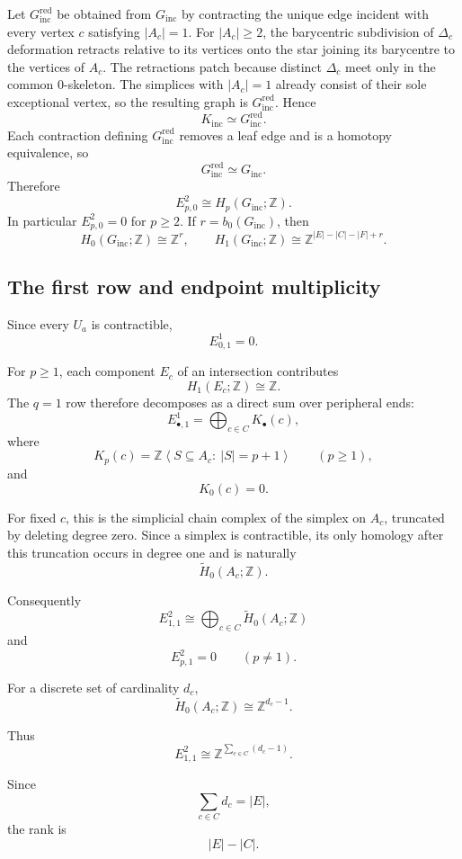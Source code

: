 \documentclass[11pt]{article}
\theoremstyle{plain}
\theoremstyle{definition}
\begin{document}
Let $G_{\mathrm{inc}}^{\mathrm{red}}$ be obtained from $G_{\mathrm{inc}}$ by
contracting the unique edge incident with every vertex $c$ satisfying
$|A_c|=1$.  For $|A_c|\geq2$, the barycentric subdivision of $\Delta_c$
deformation retracts relative to its vertices onto the star joining its
barycentre to the vertices of $A_c$.  The retractions patch because distinct
$\Delta_c$ meet only in the common $0$-skeleton.  The simplices with
$|A_c|=1$ already consist of their sole exceptional vertex, so the resulting
graph is $G_{\mathrm{inc}}^{\mathrm{red}}$.  Hence
\[
K_{\mathrm{inc}}\simeq G_{\mathrm{inc}}^{\mathrm{red}}.
\]
Each contraction defining $G_{\mathrm{inc}}^{\mathrm{red}}$ removes a leaf
edge and is a homotopy equivalence, so
\[
G_{\mathrm{inc}}^{\mathrm{red}}\simeq G_{\mathrm{inc}}.
\]
Therefore
\[
E^2_{p,0}\cong H_p(G_{\mathrm{inc}};\mathbb Z).
\]
In particular $E^2_{p,0}=0$ for $p\geq2$.  If
$r=b_0(G_{\mathrm{inc}})$, then
\[
H_0(G_{\mathrm{inc}};\mathbb Z)\cong\mathbb Z^r,
\qquad
H_1(G_{\mathrm{inc}};\mathbb Z)\cong
\mathbb Z^{|E|-|C|-|F|+r}.
\]

\subsection{The first row and endpoint multiplicity}
\label{subsec:MV-first-row}

Since every $U_a$ is contractible,
\[
E^1_{0,1}=0.
\]

For $p\geq1$, each component $E_c$ of an intersection contributes
\[
H_1(E_c;\mathbb Z)\cong\mathbb Z.
\]
The $q=1$ row therefore decomposes as a direct sum over peripheral ends:
\[
E^1_{\bullet,1}
=
\bigoplus_{c\in C}K_\bullet(c),
\]
where
\[
K_p(c)
=
\mathbb Z
\left\langle
S\subseteq A_c:\ |S|=p+1
\right\rangle
\qquad(p\geq1),
\]
and
\[
K_0(c)=0.
\]

For fixed $c$, this is the simplicial chain complex of the simplex on
$A_c$, truncated by deleting degree zero.  Since a simplex is
contractible, its only homology after this truncation occurs in degree
one and is naturally
\[
\widetilde H_0(A_c;\mathbb Z).
\]

Consequently
\[
E^2_{1,1}
\cong
\bigoplus_{c\in C}
\widetilde H_0(A_c;\mathbb Z)
\]
and
\[
E^2_{p,1}=0
\qquad
(p\neq1).
\]

For a discrete set of cardinality $d_c$,
\[
\widetilde H_0(A_c;\mathbb Z)
\cong
\mathbb Z^{d_c-1}.
\]

Thus
\[
E^2_{1,1}
\cong
\mathbb Z^{
\sum_{c\in C}(d_c-1)
}.
\]

Since
\[
\sum_{c\in C}d_c=|E|,
\]
the rank is
\[
|E|-|C|.
\]
\end{document}
